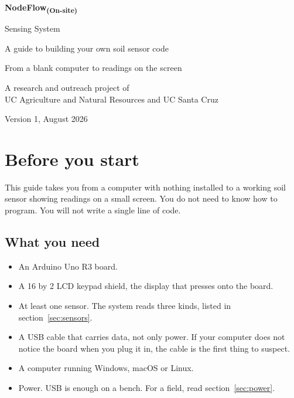 \documentclass[11pt,a4paper]{article}
\begin{document}
\begin{titlepage}
\centering
\vspace*{3cm}
{\Huge\bfseries NodeFlow\textsubscript{(On-site)}\par}
\vspace{0.6cm}
{\Large Sensing System\par}
\vspace{1.4cm}
{\large A guide to building your own soil sensor code\par}
\vspace{0.4cm}
{\large From a blank computer to readings on the screen\par}
\vfill
{\normalsize A research and outreach project of\\
UC Agriculture and Natural Resources and UC Santa Cruz\par}
\vspace{0.6cm}
{\small Version 1, August 2026\par}
\end{titlepage}

\pagestyle{plain}
\tableofcontents
\newpage

\section{Before you start}

This guide takes you from a computer with nothing installed to a working soil
sensor showing readings on a small screen. You do not need to know how to
program. You will not write a single line of code.

\subsection{What you need}

\begin{itemize}
  \item An Arduino Uno R3 board.
  \item A 16 by 2 LCD keypad shield, the display that presses onto the board.
  \item At least one sensor. The system reads three kinds, listed in
        section~\ref{sec:sensors}.
  \item A USB cable that carries data, not only power. If your computer does
        not notice the board when you plug it in, the cable is the first thing
        to suspect.
  \item A computer running Windows, macOS or Linux.
  \item Power. USB is enough on a bench. For a field, read section~\ref{sec:power}.
\end{itemize}
\end{document}
